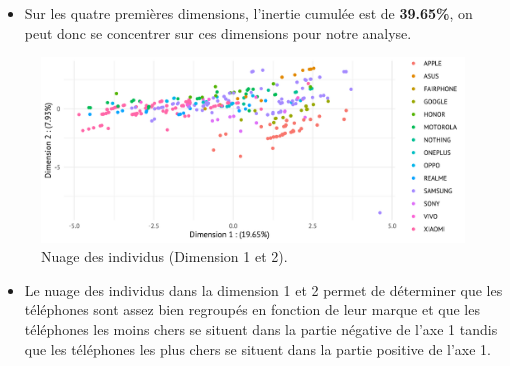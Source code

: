 \documentclass[
  12pt,
]{report}
\providecommand{\tightlist}{%
  \setlength{\itemsep}{0pt}\setlength{\parskip}{0pt}}\usepackage{longtable,booktabs,array}
\begin{document}
\begin{itemize}
\tightlist
\item
  Sur les quatre premières dimensions, l'inertie cumulée est de
  \textbf{39.65\%}, on peut donc se concentrer sur ces dimensions pour
  notre analyse.
\end{itemize}

\begin{figure}[H]

{\centering \includegraphics{report_files/figure-pdf/unnamed-chunk-12-1.pdf}

}

\caption{Nuage des individus (Dimension 1 et 2).}

\end{figure}%

\begin{itemize}
\tightlist
\item
  Le nuage des individus dans la dimension 1 et 2 permet de déterminer
  que les téléphones sont assez bien regroupés en fonction de leur
  marque et que les téléphones les moins chers se situent dans la partie
  négative de l'axe 1 tandis que les téléphones les plus chers se
  situent dans la partie positive de l'axe 1.
\end{itemize}

\newpage
\end{document}
